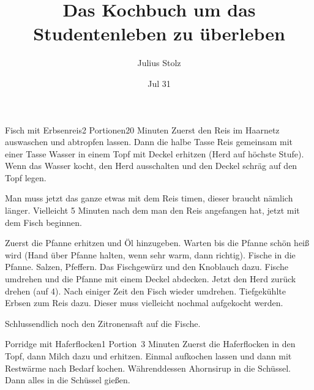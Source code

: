 \documentclass{article}
\title{Das Kochbuch um das Studentenleben zu überleben}
\author{Julius Stolz}
\date{Jul 31}
\begin{document}
\maketitle

\begin{recipe}{Fisch mit Erbsenreis}{2 Portionen}{20 Minuten}
  Zuerst den Reis im Haarnetz auswaschen und abtropfen lassen. Dann die halbe Tasse Reis gemeinsam mit einer Tasse Wasser in einem Topf mit Deckel erhitzen (Herd auf höchste Stufe). Wenn das Wasser kocht, den Herd ausschalten und den Deckel schräg auf den Topf legen.

  Man muss jetzt das ganze etwas mit dem Reis timen, dieser braucht nämlich länger. Vielleicht 5 Minuten nach dem man den Reis angefangen hat, jetzt mit dem Fisch beginnen.

  Zuerst die Pfanne erhitzen und Öl hinzugeben. Warten bis die Pfanne schön heiß wird (Hand über Pfanne halten, wenn sehr warm, dann richtig).
  Fische in die Pfanne. Salzen, Pfeffern. Das Fischgewürz und den Knoblauch dazu. Fische umdrehen und die Pfanne mit einem Deckel abdecken. Jetzt den Herd zurück drehen (auf 4). Nach einiger Zeit den Fisch wieder umdrehen.
  Tiefgekühlte Erbsen zum Reis dazu. Dieser muss vielleicht nochmal aufgekocht werden.
  
  Schlussendlich noch den Zitronensaft auf die Fische.
\end{recipe}

\begin{recipe}{Porridge mit Haferflocken}{1 Portion}{~3 Minuten}
  Zuerst die Haferflocken in den Topf, dann Milch dazu und erhitzen. Einmal aufkochen lassen und dann mit Restwärme nach Bedarf kochen.
  Währenddessen Ahornsirup in die Schüssel. Dann alles in die Schüssel gießen.
\end{recipe}
\end{document}
